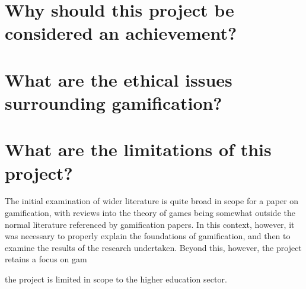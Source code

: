 \documentclass[12pt,a4paper,twoside]{report}
\begin{document}
\section{Why should this project be considered an achievement?}
\section{What are the ethical issues surrounding gamification?}

\section{What are the limitations of this project?}
The initial examination of wider literature is quite broad in scope for a paper on gamification, with reviews into the theory of games being somewhat outside the normal literature referenced by gamification papers. In this context, however, it was necessary to properly explain the foundations of gamification, and then to examine the results of the research undertaken. Beyond this, however, the project retains a focus on gam

 the project is limited in scope to the higher education sector. 
\end{document}
